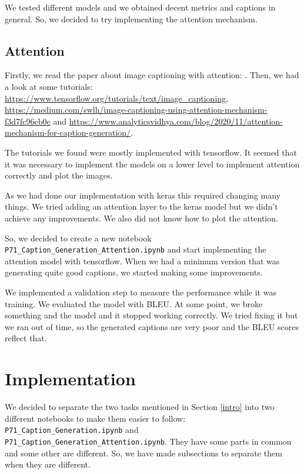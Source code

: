 \documentclass{article} %
\begin{document}
We tested different models and we obtained decent metrics and captions in general. So, we decided to try implementing the attention mechanism.

\subsection{Attention}

Firstly, we read the paper about image captioning with attention: \cite{ShowAttendTell}. Then, we had a look at some tutorials: \url{https://www.tensorflow.org/tutorials/text/image_captioning},  \url{https://medium.com/swlh/image-captioning-using-attention-mechanism-f3d7fc96eb0e} and \url{https://www.analyticsvidhya.com/blog/2020/11/attention-mechanism-for-caption-generation/}.

The tutorials we found were mostly implemented with tensorflow. It seemed that it was necessary to implement the models on a lower level to implement attention correctly and plot the images.

As we had done our implementation with keras this required changing many things. We tried adding an attention layer to the keras model but we didn't achieve any improvements. We also did not know how to plot the attention. 

So, we decided to create a new notebook \texttt{P71\_Caption\_Generation\_Attention.ipynb} and start implementing the attention model with tensorflow. When we had a minimum version that was generating quite good captions, we started making some improvements. 

We implemented a validation step to measure the performance while it was training. We evaluated the model with BLEU. At some point, we broke something and the model and it stopped working correctly. We tried fixing it but we ran out of time, so the generated captions are very poor and the BLEU scores reflect that.

\section{Implementation}

We decided to separate the two tasks mentioned in Section \ref{intro} into two different notebooks to make them easier to follow: \texttt{P71\_Caption\_Generation.ipynb} and \texttt{P71\_Caption\_Generation\_Attention.ipynb}. They have some parts in common and some other are different. So, we have made subsections to separate them when they are different.
\end{document}
